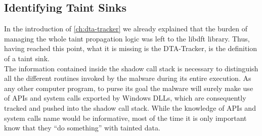 \documentclass[LaM,binding=0.6cm]{sapthesis}
\begin{document}
\subsection{Identifying Taint Sinks}
\label{subsec:taintsinks}
In the introduction of \autoref{ch:dta-tracker} we already explained that the burden of managing the whole taint propagation logic was left to the libdft library. Thus, having reached this point, what it is missing is the {\sf DTA-Tracker}, is the definition of a taint sink.\\

The information contained inside the shadow call stack is necessary to distinguish all the different routines invoked by the malware during its entire execution. As any other computer program, to purse its goal the malware will surely make use of APIs and system calls exported by Windows DLLs, which are consequently tracked and pushed into the shadow call stack. While the knowledge of APIs and system calls name would be informative, most of the time it is only important know that they ``do something'' with tainted data.
\end{document}
